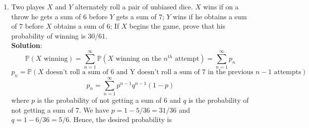 \documentclass{article}
\newcommand{\dsum}{\displaystyle\sum}
\newcommand{\Pb}{\mathbb{P}}
\newcommand{\bkt}[1]{\left(#1\right)}
\newcommand{\soln}[1]{\textbf{Solution}: #1}
\begin{document}
\begin{enumerate}
		$$q_n = \dfrac{1+\bkt{1-2p}^n}2$$
		\soln{
		We will condition on the $n^{th}$ toss.
		\begin{align}
			q_n & = \Pb \bkt{\text{Obtaining even number of heads in $n$ independent tosses }\vert\text{ Last toss is a head}} \Pb \bkt{\text{Last toss is a head}}\\
		& + \Pb \bkt{\text{Obtaining even number of heads in $n$ independent tosses }\vert\text{ Last toss is a tail}} \Pb \bkt{\text{Last toss is a tail}}\\
		& = \Pb\bkt{\text{Obtaining odd number of heads in $n-1$ independent tosses}} \cdot \Pb \bkt{\text{Last toss is a head}}\\
		& + \Pb\bkt{\text{Obtaining even number of heads in $n-1$ independent tosses}} \cdot \Pb \bkt{\text{Last toss is a tail}}\\
		& = \bkt{1-q_{n-1}}p + q_{n-1} \bkt{1-p} = p + \bkt{1-2p}q_{n-1}
		\end{align}
		Note that $q_1=1-p$. Hence, we have
		\begin{align}
			q_n & = p + (1-2p)\bkt{p+\bkt{1-2p}q_{n-2}} = p + p \bkt{1-2p} + \bkt{1-2p}^2 q_{n-2}\\
			& = p + p\bkt{1-2p} + p \bkt{1-2p}^2 + p \bkt{1-2p}^3 + \cdots + \bkt{1-2p}^{n-1} q_1\\
			& = p \dsum_{k=0}^{n-2} \bkt{1-2p}^k + (1-p)\bkt{1-2p}^{n-1}\\
			& = p \bkt{\dfrac{1-\bkt{1-2p}^{n-1}}{2p}} + \bkt{1-p}\bkt{1-2p}^{n-1}\\
			& = \dfrac{1-\bkt{1-2p}^{n-1}}2 + \dfrac{2\bkt{1-p}\bkt{1-2p}^{n-1}}2\\
			& = \dfrac{1 + \bkt{1-2p}^{n-1}\bkt{2-2p-1}}2\\
			& = \dfrac{1+\bkt{1-2p}^n}2
		\end{align}
		}
		\item
		Two playes $X$ and $Y$ alternately roll a pair of unbiased dice. $X$ wins if on a throw he gets a sum of $6$ before $Y$ gets a sum of $7$; $Y$ wins if he obtains a sum of $7$ before $X$ obtains a sum of $6$; If $X$ begins the game, prove that his probability of winning is $30/61$.\\
		\soln{
		$$\Pb\bkt{X \text{ winning}} = \dsum_{n=1}^{\infty}\Pb\bkt{X \text{ winning on the $n^{th}$ attempt}}  = \dsum_{n=1}^{\infty}p_n$$
		$$p_n = \Pb\bkt{\text{$X$ doesn't roll a sum of $6$ and Y doesn't roll a sum of $7$ in the previous $n-1$ attempts}}$$
		$$p_n = \dsum_{n=1}^{\infty} p^{n-1}q^{n-1} \bkt{1-p}$$
		where $p$ is the probability of not getting a sum of $6$ and $q$ is the probability of not getting a sum of $7$. We have $p=1-5/36 = 31/36$ and $q=1-6/36 = 5/6$. Hence, the desired probability is
}
\end{enumerate}
\end{document}
